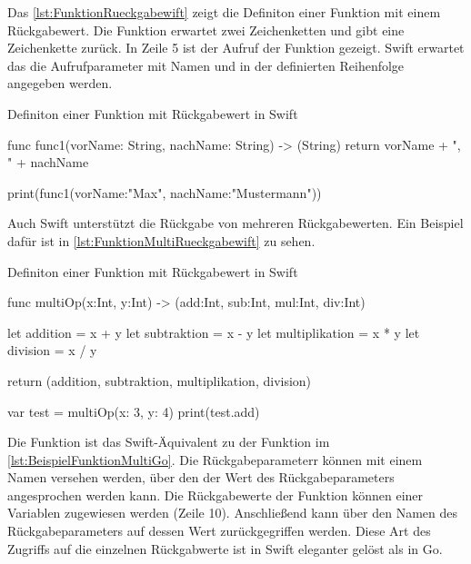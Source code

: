 Das \autoref{lst:FunktionRueckgabewift} zeigt die Definiton einer Funktion mit einem Rückgabewert. 
Die Funktion erwartet zwei Zeichenketten und gibt eine Zeichenkette zurück.
In Zeile 5 ist der Aufruf der Funktion gezeigt. 
Swift erwartet das die Aufrufparameter mit Namen und in der definierten Reihenfolge angegeben werden.

\begin{listing}
\caption{Definiton einer Funktion mit Rückgabewert in Swift}
\label{lst:FunktionRueckgabewift}
\begin{SwiftCode}
func func1(vorName: String, nachName: String) -> (String){
    return vorName + ", " + nachName
}

print(func1(vorName:"Max", nachName:"Mustermann"))
\end{SwiftCode}
\end{listing}

Auch Swift unterstützt die Rückgabe von mehreren Rückgabewerten.
Ein Beispiel dafür ist in \autoref{lst:FunktionMultiRueckgabewift} zu sehen. 

\begin{listing}
\caption{Definiton einer Funktion mit Rückgabewert in Swift}
\label{lst:FunktionMultiRueckgabewift}
\begin{SwiftCode}
func multiOp(x:Int, y:Int) -> (add:Int, sub:Int, mul:Int, div:Int){
    let addition = x + y
    let subtraktion = x - y
    let multiplikation = x * y
    let division = x / y
	
    return (addition, subtraktion, multiplikation, division)
}

var test = multiOp(x: 3, y: 4)
print(test.add)
\end{SwiftCode}
\end{listing}

Die Funktion ist das Swift-Äquivalent zu der Funktion im \autoref{lst:BeispielFunktionMultiGo}. 
Die Rückgabeparameterr können mit einem Namen versehen werden, über den der Wert des Rückgabeparameters angesprochen werden kann. 
Die Rückgabewerte der Funktion können einer Variablen zugewiesen werden (Zeile 10).
Anschließend kann über den Namen des Rückgabeparameters auf dessen Wert zurückgegriffen werden. 
Diese Art des Zugriffs auf die einzelnen Rückgabwerte ist in Swift eleganter gelöst als in Go.



